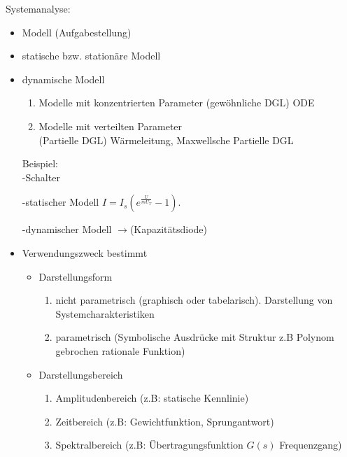 \documentclass[ngerman]{tudscrreprt}
\begin{document}
	Systemanalyse:
	\begin{itemize}
	\item Modell (Aufgabestellung)
	\item statische bzw. stationäre Modell
	\item dynamische Modell 
	\begin{enumerate}
		\item Modelle mit konzentrierten Parameter (gewöhnliche DGL) ODE
		\item Modelle mit verteilten Parameter\\ (Partielle DGL) Wärmeleitung, Maxwellsche Partielle DGL
	\end{enumerate}

	Beispiel:\\

	\subitem -Schalter 
	\begin{figure}[H] 
		\centering 
		\def\svgwidth{100pt} 
		 
	\end{figure} 

	\subitem -statischer Modell $I = I_s (e^{\frac{U}{mU_T} } - 1).$
	\begin{figure}[H] 
		\centering 
		\def\svgwidth{100pt} 
		 
	\end{figure} 

	\subitem -dynamischer Modell $\rightarrow$(Kapazitätsdiode)
	
	\item Verwendungszweck bestimmt 
			\begin{itemize}
			\item{Darstellungsform}
			\begin{enumerate}
				\item nicht parametrisch (graphisch oder tabelarisch). Darstellung von Systemcharakteristiken
				\item parametrisch (Symbolische Ausdrücke mit Struktur z.B Polynom gebrochen rationale Funktion)
			\end{enumerate}
			\end{itemize}
			\begin{itemize}
				\item Darstellungsbereich
	 		\begin{enumerate}
				\item Amplitudenbereich (z.B: statische Kennlinie)
				\item Zeitbereich (z.B: Gewichtfunktion, Sprungantwort)
				\item Spektralbereich (z.B: Übertragungsfunktion $G(s)$ Frequenzgang)
			\end{enumerate}


\end{itemize}
\end{itemize}
\end{document}
